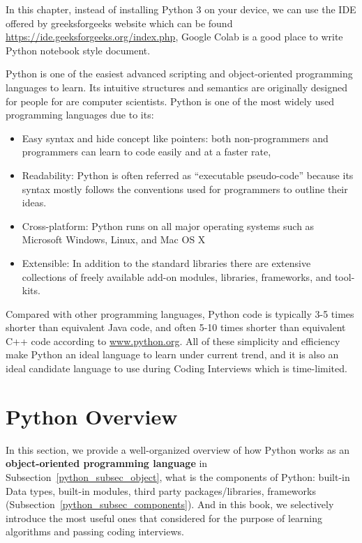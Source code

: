 \documentclass[../main.tex]{subfiles}
\begin{document}
In this chapter, instead of installing Python 3 on your device, we can use the IDE offered by greeksforgeeks website which can be found \url{https://ide.geeksforgeeks.org/index.php}, Google Colab is a good place to write Python notebook style document. 

Python is one of the easiest advanced scripting and object-oriented programming languages to learn. Its intuitive structures and semantics are originally designed for people for are computer scientists. Python is one of the most widely used programming languages due to its:
\begin{itemize}
    \item Easy syntax and hide concept like pointers: both non-programmers and programmers can learn to code easily and at a faster rate,
    \item Readability: Python is often referred as ``executable pseudo-code'' because its syntax mostly follows the conventions used for programmers to outline their ideas.
    \item Cross-platform: Python runs on all major operating systems such as Microsoft Windows, Linux, and Mac OS X
    \item Extensible: In addition to the standard libraries there are extensive collections of freely available add-on modules, libraries, frameworks, and tool-kits. 
\end{itemize}
Compared with other programming languages, Python code is typically 3-5 times shorter than equivalent Java code, and often 5-10 times shorter than equivalent C++ code according to \url{www.python.org}. All of these simplicity and efficiency make Python an ideal language to learn under current trend, and it is also an ideal candidate language to use during Coding Interviews which is time-limited.  %

\section{Python Overview}
\label{python_sec_overview}
In this section, we provide a well-organized overview of how Python works as an \textbf{object-oriented programming language} in Subsection~\ref{python_subsec_object}, what is the components of Python: built-in Data types, built-in modules, third party packages/libraries, frameworks (Subsection~\ref{python_subsec_components}). And in this book, we selectively introduce the most useful ones that considered for the purpose of learning algorithms and passing coding interviews.
\end{document}
